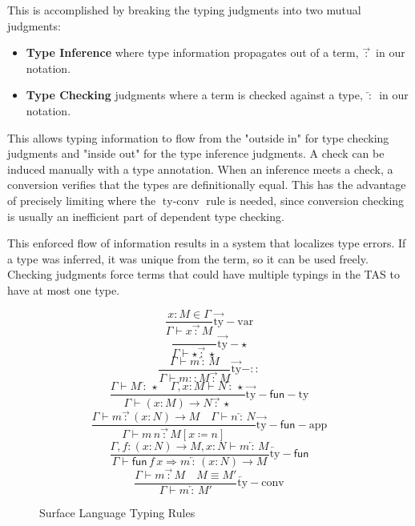 
This is accomplished by breaking the typing judgments into two mutual judgments:
\begin{itemize}
\item \textbf{Type Inference} where type information propagates out of a term, $\overrightarrow{\,:\,}$ in our notation. 
\item \textbf{Type Checking} judgments where a term is checked against a type, $\overleftarrow{\,:\,}$ in our notation. 
\end{itemize}
This allows typing information to flow from the "outside in" for type checking judgments and "inside out" for the type inference judgments.
A check can be induced manually with a type annotation.
When an inference meets a check, a conversion verifies that the types are definitionally equal.
This has the advantage of precisely limiting where the $\operatorname{ty-conv}$ rule is needed, since conversion checking is usually an inefficient part of dependent type checking.

This enforced flow of information results in a system that localizes type errors.
If a type was inferred, it was unique from the term, so it can be used freely.
Checking judgments force terms that could have multiple typings in the \ac{TAS} to have at most one type.

\begin{figure}
\[
\frac{x:M\in\Gamma}{\Gamma\vdash x\overrightarrow{\,:\,}M}\operatorname{\overrightarrow{ty}-var}
\]
\[
\frac{\,}{\Gamma\vdash\star\overrightarrow{\,:\,}\star}\operatorname{\overrightarrow{ty}-\star}
\]
\[
\frac{\Gamma\vdash m\overleftarrow{\,:\,}M}{\Gamma\vdash m::M\overrightarrow{\,:\,}M}\operatorname{\overrightarrow{ty}-::}
\]
\[
\frac{\Gamma\vdash M\overleftarrow{\,:\,}\star\quad\Gamma,x:M\vdash N\overleftarrow{\,:\,}\star}{\Gamma\vdash\left(x:M\right)\rightarrow N\overrightarrow{\,:\,}\star}\operatorname{\overrightarrow{ty}-\mathsf{fun}-ty}
\]
\[
\frac{\Gamma\vdash m\overrightarrow{\,:\,}\left(x:N\right)\rightarrow M\quad\Gamma\vdash n\overleftarrow{\,:\,}N}{\Gamma\vdash m\,n\overrightarrow{\,:\,}M\left[x\coloneqq n\right]}\operatorname{\overrightarrow{ty}-\mathsf{fun}-app}
\]
\[
\frac{\Gamma,f:\left(x:N\right)\rightarrow M,x:N\vdash m\overleftarrow{\,:\,}M}{\Gamma\vdash\mathsf{fun}\,f\,x\Rightarrow m\overleftarrow{\,:\,}\left(x:N\right)\rightarrow M}\operatorname{\overleftarrow{ty}-\mathsf{fun}}
\]
\[
\frac{\Gamma\vdash m\overrightarrow{\,:\,}M\quad M\equiv M'}{\Gamma\vdash m\overleftarrow{\,:\,}M'}\operatorname{\overleftarrow{ty}-conv}
\]

\caption{Surface Language \Bidir{} Typing Rules}
\label{fig:surface-bityping-rules}
\end{figure}

